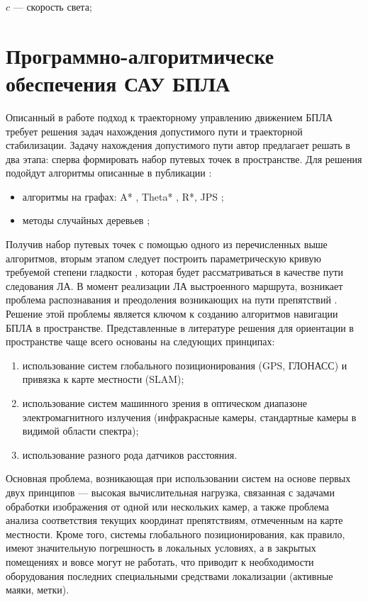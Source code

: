 \documentclass[pract, och, master]{SCWorks}
\begin{document}
$c$ --- скорость света;

\section{Программно-алгоритмическе обеспечения САУ БПЛА}

Описанный в работе \cite{Tkachev} подход к траекторному управлению движением БПЛА требует решения задач нахождения допустимого пути и траекторной стабилизации. 
Задачу нахождения допустимого пути автор предлагает решать в два этапа: сперва формировать набор путевых точек в пространстве. Для решения подойдут алгоритмы описанные в 
публикации \cite{Yakovlev}:
\begin{itemize}
	\item алгоритмы на графах: A* \cite{minPathA}, Theta* \cite{theta}, R*\cite{R}, JPS \cite{JPS};
	\item методы случайных деревьев \cite{motionPlanning, treeRRT};
\end{itemize}
 
Получив набор путевых точек с помощью одного из перечисленных выше алгоритмов, вторым этапом следует построить параметрическую кривую 
требуемой степени гладкости \cite{Bestaoui, Shanmugavel, Pan}, которая будет рассматриваться в качестве пути следования ЛА. В момент реализации ЛА выстроенного маршрута, 
возникает проблема распознавания и преодоления возникающих на пути препятствий \cite{Gonoblev}. Решение этой проблемы является ключом к созданию алгоритмов навигации 
БПЛА в пространстве. Представленные в литературе решения \cite{Shirokov, Mystafaev, Gerasuto} для ориентации в пространстве чаще всего основаны на следующих принципах:
\begin{enumerate}
	\item использование систем глобального позиционирования (GPS, ГЛОНАСС) и привязка к карте местности (SLAM);
	\item использование систем машинного зрения в оптическом диапазоне электромагнитного излучения (инфракрасные камеры, стандартные камеры в видимой области спектра);
	\item использование разного рода датчиков расстояния.
\end{enumerate}

Основная проблема, возникающая при использовании систем на основе первых двух принципов --- высокая вычислительная нагрузка, связанная с задачами обработки
изображения от одной или нескольких камер, а также проблема анализа соответствия текущих координат препятствиям, отмеченным на карте местности. Кроме того, системы
глобального позиционирования, как правило, имеют значительную погрешность в локальных условиях, а в закрытых помещениях и вовсе могут не работать, что приводит к
необходимости оборудования последних специальными средствами локализации (активные маяки, метки).
\end{document}

